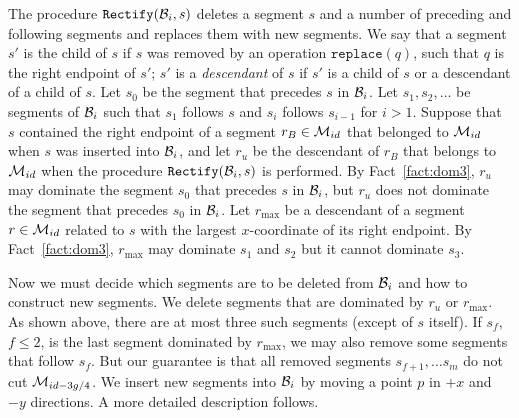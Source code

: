 \documentclass[10pt]{llncs}
\def\idtt#1{\ensuremath{\mathtt{#1}}}
\newcommand{\cM}{{\cal M}}
\newcommand{\cB}{{\cal B}}
\newcommand{\replace}{\idtt{replace}}
\newcommand{\Rectify}{\idtt{Rectify}}
\begin{document}
The procedure $\Rectify(\cB_i,s)$ deletes a segment  $s$ and a number 
of preceding and following segments and replaces them 
with new segments. We say that a segment $s'$ is the child 
of $s$ if $s$ was removed by an operation $\replace(q)$, such 
that $q$ is the right endpoint of $s'$; $s'$ is a \emph{descendant} of $s$ 
if $s'$ is a child of $s$ or a descendant of a child of $s$.
Let $s_0$ be the segment that precedes $s$ in $\cB_i$. 
Let $s_1,s_2,\ldots$ be segments of $\cB_i$ such that $s_1$ follows 
$s$ and $s_i$ follows $s_{i-1}$ for $i>1$.
Suppose that $s$ contained the right endpoint of a segment $r_B\in \cM_{id}$
that belonged to $\cM_{id}$ when $s$ was inserted into $\cB_i$, 
and let $r_u$ be the descendant of $r_B$ that belongs to $\cM_{id}$ 
when the procedure $\Rectify(\cB_i,s)$ is performed. 
By Fact~\ref{fact:dom3}, $r_u$ may dominate the segment $s_0$ that 
precedes $s$ in $\cB_i$, but $r_u$ does not dominate the segment 
that precedes $s_0$ in $\cB_i$. 
Let $r_{\max}$ be a descendant of a segment $r\in \cM_{id}$ related 
to $s$ with the largest $x$-coordinate of its right endpoint. 
By Fact~\ref{fact:dom3}, $r_{\max}$ may dominate $s_1$ and $s_2$
but it cannot dominate $s_3$.

Now we must decide which segments are to be deleted from $\cB_i$ and 
how to construct new segments. We delete segments that are dominated 
by $r_u$ or $r_{\max}$. As shown above, there are at most three 
such segments (except of $s$ itself). If $s_f$, $f\leq 2$, is the last 
segment dominated by $r_{\max}$, we may also remove some segments that
follow $s_f$. But our guarantee is that 
all removed segments $s_{f+1},\ldots s_m$ do not cut $\cM_{id-3g/4}$.
We insert new segments into $\cB_i$ by moving a point $p$ 
in $+x$ and $-y$ directions.  A more detailed description 
follows.
\end{document}
